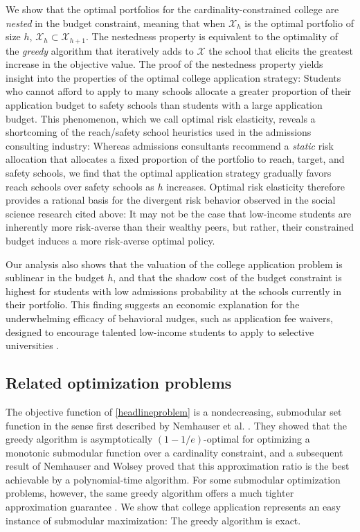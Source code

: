 We show that the optimal portfolios for the cardinality-constrained college are \emph{nested} in the budget constraint, meaning that when $\mathcal{X}_h$ is the optimal portfolio of size $h$, $\mathcal{X}_h \subset \mathcal{X}_{h+1}$. The nestedness property is equivalent to the optimality of the \emph{greedy} algorithm that iteratively adds to $\mathcal{X}$ the school that elicits the greatest increase in the objective value. The proof of the nestedness property yields insight into the properties of the optimal college application strategy: Students who cannot afford to apply to many schools allocate a greater proportion of their application budget to safety schools than students with a large application budget. This phenomenon, which we call optimal risk elasticity, reveals a shortcoming of the reach/safety school heuristics used in the admissions consulting industry: Whereas admissions consultants recommend a \emph{static} risk allocation that allocates a fixed proportion of the portfolio to reach, target, and safety schools, we find that the optimal application strategy gradually favors reach schools over safety schools as $h$ increases. Optimal risk elasticity therefore provides a rational basis for the divergent risk behavior observed in the social science research cited above: It may not be the case that low-income students are inherently more risk-averse than their wealthy peers, but rather, their constrained budget induces a more risk-averse optimal policy. 

Our analysis also shows that the valuation of the college application problem is sublinear in the budget $h$, and that the shadow cost of the budget constraint is highest for students with low admissions probability at the schools currently in their portfolio. This finding suggests an economic explanation for the underwhelming efficacy of behavioral nudges, such as application fee waivers, designed to encourage talented low-income students to apply to selective universities \cite{gurantzetal2021}. 

\subsection{Related optimization problems}

The objective function of \eqref{headlineproblem} is a nondecreasing, submodular set function in the sense first described by Nemhauser et al. \cite{nemhauseretal1978}. They showed that the greedy algorithm is asymptotically $(1 - 1/e)$-optimal for optimizing a monotonic submodular function over a cardinality constraint, and a subsequent result of Nemhauser and Wolsey \cite{nemhauserandwolsey1978} proved that this approximation ratio is the best achievable by a polynomial-time algorithm. For some submodular optimization problems, however, the same greedy algorithm offers a much tighter approximation guarantee \cite{contrerasandfernandez2014}. We show that college application represents an easy instance of submodular maximization: The greedy algorithm is exact.


